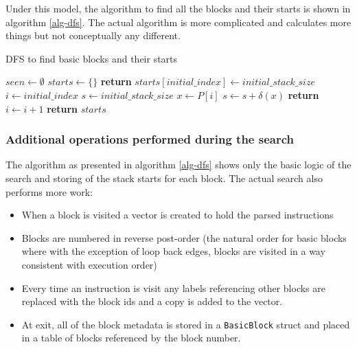 Under this model, the algorithm to find all the blocks and their starts is shown in algorithm
\ref{alg-dfs}. The actual algorithm is more complicated and calculates more things but not
conceptually any different.

\begin{algorithm}
      \caption{DFS to find basic blocks and their starts}\label{alg-dfs}
      \begin{algorithmic}[1]
            \State $seen \gets \emptyset$
            \State $starts \gets \{\}$
            \State \textbf{return}
            \EndIf
            \State $starts[initial\_index] \gets initial\_stack\_size$
            \State $i \gets initial\_index$
            \State $s \gets initial\_stack\_size$
            \Repeat
            \State $x \gets P[i]$
            \State $s \gets s + \delta(x)$
            \State {}
            \EndFor
            \State {}
            \EndIf
            \State \textbf{return}
            \EndIf
            \State $i \gets i + 1$
            \EndFunction
            \State {}
            \State \textbf{return} $starts$
            \EndFunction
      \end{algorithmic}
\end{algorithm}

\subsubsection{Additional operations performed during the search}

The algorithm as presented in algorithm \ref{alg-dfs} shows only the basic logic of the search and
storing of the stack starts for each block. The actual search also performs more work:

\begin{itemize}
      \item When a block is visited a vector is created to hold the parsed instructions
      \item Blocks are numbered in reverse post-order (the natural order for basic blocks where
            with the exception of loop back edges, blocks are visited in a way consistent with
            execution order)
      \item Every time an instruction is visit any labels referencing other blocks are replaced
            with the block ids and a copy is added to the vector.
      \item At exit, all of the block metadata is stored in a \texttt{BasicBlock} struct and placed
            in a table of blocks referenced by the block number.
\end{itemize}

